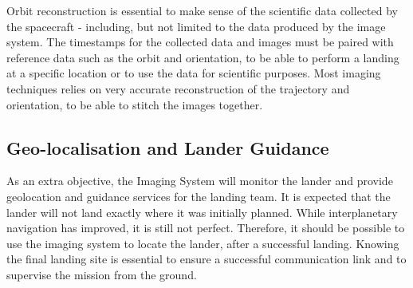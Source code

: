 Orbit reconstruction is essential to make sense of the scientific data collected by the spacecraft - including, but not limited to the data produced by the image system. The timestamps for the collected data and images must be paired with reference data such as the orbit and orientation, to be able to perform a landing at a specific location or to use the data for scientific purposes. Most imaging techniques relies on very accurate reconstruction of the trajectory and orientation, to be able to stitch the images together.
\subsection{Geo-localisation and Lander Guidance}
As an extra objective, the Imaging System will monitor the lander and provide geolocation and guidance services for the landing team. It is expected that the lander will not land exactly where it was initially planned. While interplanetary navigation has improved, it is still not perfect\cite{nasa2012}. Therefore, it should be possible to use the imaging system to locate the lander, after a successful landing. Knowing the final landing site is essential to ensure a successful communication link and to supervise the mission from the ground.